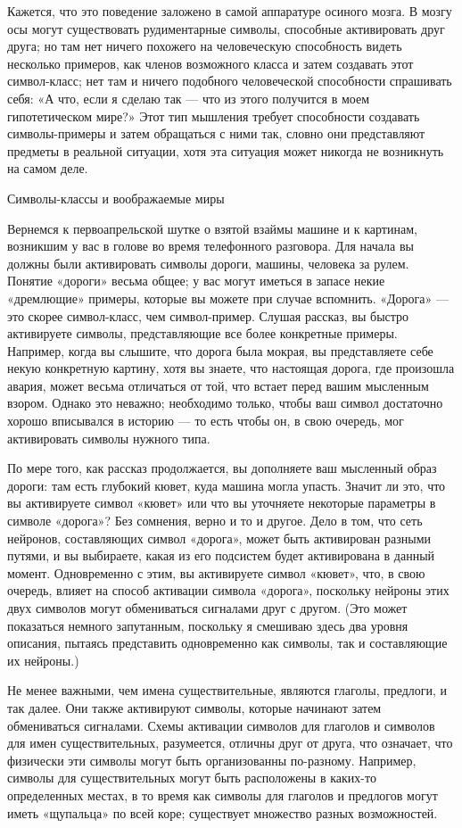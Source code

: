 \documentclass[../main.tex]{subfiles}
\begin{document}
Кажется, что это поведение заложено в самой аппаратуре осиного мозга. В мозгу осы могут существовать рудиментарные символы, способные активировать друг друга; но там нет ничего похожего на человеческую способность видеть несколько примеров, как членов возможного класса и затем создавать этот символ-класс; нет там и ничего подобного человеческой способности спрашивать себя: «А что, если я сделаю так --- что из этого получится в моем гипотетическом мире?» Этот тип мышления требует способности создавать символы-примеры и затем обращаться с ними так, словно они представляют предметы в реальной ситуации, хотя эта ситуация может никогда не возникнуть на самом деле.

Символы-классы и воображаемые миры

Вернемся к первоапрельской шутке о взятой взаймы машине и к картинам, возникшим у вас в голове во время телефонного разговора. Для начала вы должны были активировать символы дороги, машины, человека за рулем. Понятие «дороги» весьма общее; у вас могут иметься в запасе некие «дремлющие» примеры, которые вы можете при случае вспомнить. «Дорога» --- это скорее символ-класс, чем символ-пример. Слушая рассказ, вы быстро активируете символы, представляющие все более конкретные примеры. Например, когда вы слышите, что дорога была мокрая, вы представляете себе некую конкретную картину, хотя вы знаете, что настоящая дорога, где произошла авария, может весьма отличаться от той, что встает перед вашим мысленным взором. Однако это неважно; необходимо только, чтобы ваш символ достаточно хорошо вписывался в историю --- то есть чтобы он, в свою очередь, мог активировать символы нужного типа.

По мере того, как рассказ продолжается, вы дополняете ваш мысленный образ дороги: там есть глубокий кювет, куда машина могла упасть. Значит ли это, что вы активируете символ «кювет» или что вы уточняете некоторые параметры в символе «дорога»? Без сомнения, верно и то и другое. Дело в том, что сеть нейронов, составляющих символ «дорога», может быть активирован разными путями, и вы выбираете, какая из его подсистем будет активирована в данный момент. Одновременно с этим, вы активируете символ «кювет», что, в свою очередь, влияет на способ активации символа «дорога», поскольку нейроны этих двух символов могут обмениваться сигналами друг с другом. (Это может показаться немного запутанным, поскольку я смешиваю здесь два уровня описания, пытаясь представить одновременно как символы, так и составляющие их нейроны.)

Не менее важными, чем имена существительные, являются глаголы, предлоги, и так далее. Они также активируют символы, которые начинают затем обмениваться сигналами. Схемы активации символов для глаголов и символов для имен существительных, разумеется, отличны друг от друга, что означает, что физически эти символы могут быть организованны по-разному. Например, символы для существительных могут быть расположены в каких-то определенных местах, в то время как символы для глаголов и предлогов могут иметь «щупальца» по всей коре; существует множество разных возможностей.
\end{document}

